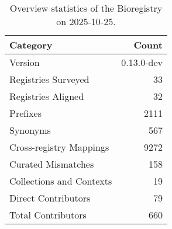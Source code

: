 \begin{table}
\caption{Overview statistics of the Bioregistry on 2025-10-25.}
\label{tab:bioregistry-summary}
\begin{tabular}{lr}
\toprule
Category & Count \\
\midrule
Version & 0.13.0-dev \\
Registries Surveyed & 33 \\
Registries Aligned & 32 \\
Prefixes & 2111 \\
Synonyms & 567 \\
Cross-registry Mappings & 9272 \\
Curated Mismatches & 158 \\
Collections and Contexts & 19 \\
Direct Contributors & 79 \\
Total Contributors & 660 \\
\bottomrule
\end{tabular}
\end{table}
